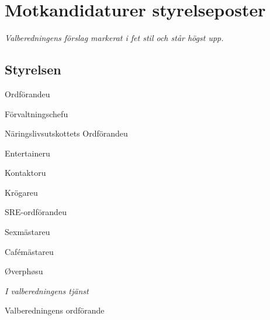 \documentclass[10pt]{article}
\def\doctype{Sena Handlingar} %
\def\mname{Valmötet} %
\def\mnum{VM/18} %
\def\date{2018-11-29} %
\def\mtime{17:15}
\def\place{E:A}
\begin{document}
    
    
 
    
    \section{Motkandidaturer styrelseposter}
    \emph{Valberedningens förslag markerat i fet stil och står högst upp.}
        
    \subsection{Styrelsen}
    
    \begin{vallista}
        \begin{post}{Ordförande}{u}
        \end{post}
        \begin{post}{Förvaltningschef}{u}
        \end{post}
        \begin{post}{Näringslivsutskottets Ordförande}{u}
        \end{post}
        \begin{post}{Entertainer}{u}
        \end{post}
        \begin{post}{Kontaktor}{u}
        \end{post}
        \begin{post}{Krögare}{u}
        \end{post}
        \begin{post}{SRE-ordförande}{u}
        \end{post}
        \begin{post}{Sexmästare}{u}
        \end{post}
        \begin{post}{Cafémästare}{u}
        \end{post}
        \begin{post}{Øverphøs}{u}
        \end{post}
    \end{vallista}
    

    \begin{signatures}{1}
        \emph{I valberedningens tjänst}
        \signature{Pontus Landgren}{Valberedningens ordförande}
    \end{signatures}
    
    
\end{document}
